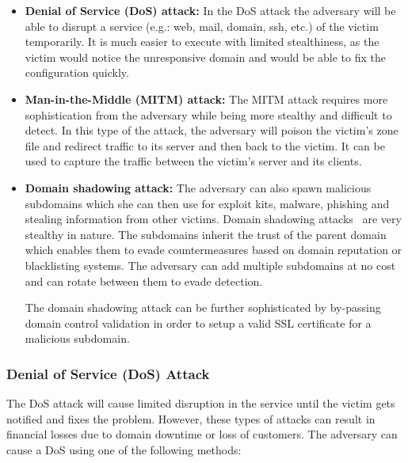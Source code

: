 \begin{itemize}
\item \textbf{Denial of Service (DoS) attack:} In the DoS attack the adversary will be able to disrupt a service (e.g.: web, mail, domain, ssh, etc.) of the victim temporarily. 
It is much easier to execute with limited stealthiness, as the victim would notice the unresponsive domain and would be able to fix the configuration quickly. 


\item \textbf{Man-in-the-Middle (MITM) attack:} The MITM attack requires more sophistication from the adversary while being more stealthy and difficult to detect. In this type of the attack, %
the adversary will %
poison the victim's zone file and redirect traffic to its server and then back to the victim. %
It can be used to capture the traffic between the victim's server and its clients. %

\item \textbf{Domain shadowing attack:} %
The adversary %
can also spawn malicious subdomains which she can then use for exploit kits, malware, phishing and stealing information from other victims. 
Domain shadowing attacks~\cite{shadowing} are %
very stealthy in nature. 
The subdomains inherit the trust of the parent domain which enables them to evade countermeasures based on domain reputation or blacklisting systems. 
The adversary can %
add multiple subdomains at no cost and can rotate between them to evade detection. 

The domain shadowing attack can be further sophisticated by by-passing domain control validation in order to setup a valid SSL certificate for a malicious subdomain.

\end{itemize}



\subsubsection{Denial of Service (DoS) Attack} 
The DoS attack will %
cause limited disruption in the service until the victim gets notified and fixes the problem. However, these types of attacks can result in financial losses due to domain downtime or loss of customers. The adversary can cause %
 a DoS using one of the following methods: %


